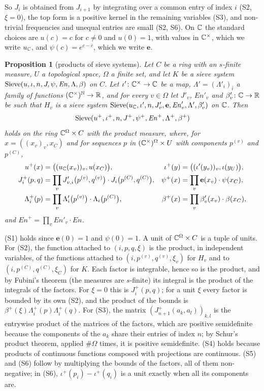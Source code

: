 \documentclass[11pt,a4paper]{article}
\makeatletter
\theoremstyle{plainx}
\newtheorem{proposition}[theorem]{Proposition}
\theoremstyle{uprightx}
\renewenvironment{proof}[1][Proof]{\par\pushQED{\qed}\normalfont\topsep0pt\partopsep0pt
  \trivlist\item[\hskip\labelsep\itshape #1.]\ignorespaces}{\popQED\endtrivlist\@endpefalse}
\newcommand{\cj}[1]{\overline{#1}}                  %
\makeatother
\begin{document}
So $J_i$ is obtained from $J_{i+1}$ by integrating over a common entry of index $i$ (S2, $\xi=0$), the top form is a
positive kernel in the remaining variables (S3), and non-trivial frequencies and unequal entries are small (S2, S6).
On $\mathbb{C}$ the standard choices are $u(c)=c$ for $c\ne0$ and $u(0)=1$, with values in $\mathbb{C}^\times$, which we write
$u_{\mathbb{C}}$, and $\psi(c)=e^{c-\cj{c}}$, which we write $\mathbf e$.

\begin{proposition}[products of sieve systems]\label{p:pi}
Let $C$ be a ring with an $s$-finite measure, $U$ a topological space, $\Omega$ a finite set, and let
$K$ be a sieve system $\operatorname{Sieve}(u,\iota,n,J,\psi,\mathit{En},\Lambda,\beta)$ on $C$. Let
$\iota'\colon\mathbb{C}^\times\to\mathbb{C}$ be a map, $\Lambda'=(\Lambda'_i)_i$ a family of functions
$(\mathbb{C}^{\times})^{\mathbb{N}}\to\mathbb{R}$, and for every $v\in\Omega$ let $J'_v$, $\mathit{En}'_v$ and
$\beta'_v\colon\mathbb{C}\to\mathbb{R}$ be such that $H_v$ is a sieve system
$\operatorname{Sieve}(u_{\mathbb{C}},\iota',n,J'_v,\mathbf e,\mathit{En}'_v,\Lambda',\beta'_v)$ on $\mathbb{C}$. Then
\[\operatorname{Sieve}(u^{+},\iota^{+},n,J^{+},\psi^{+},\mathit{En}^{+},\Lambda^{+},\beta^{+})\]
holds on the ring $\mathbb{C}^{\Omega}\times C$ with the product measure, where, for $x=((x_v)_v,x_C)$ and for sequences
$p$ in $(\mathbb{C}^\times)^\Omega\times U$ with components $p^{(v)}$ and $p^{(C)}$,
\begin{align*}
u^{+}(x)&=\bigl((u_{\mathbb{C}}(x_v))_v,u(x_C)\bigr), & \iota^{+}(y)&=\bigl((\iota'(y_v))_v,\iota(y_U)\bigr),\\
J^{+}_i(p,q)&=\prod_vJ'_{v,i}\bigl(p^{(v)},q^{(v)}\bigr)\cdot J_i\bigl(p^{(C)},q^{(C)}\bigr), & \psi^{+}(x)&=\prod_v\mathbf e(x_v)\cdot\psi(x_C),\\
\Lambda^{+}_i(p)&=\prod_v\Lambda'_i\bigl(p^{(v)}\bigr)\cdot\Lambda_i\bigl(p^{(C)}\bigr), & \beta^{+}(x)&=\prod_v\beta'_v(x_v)\cdot\beta(x_C),
\end{align*}
and $\mathit{En}^{+}=\prod_v\mathit{En}'_v\cdot\mathit{En}$.
\end{proposition}
\begin{proof}
(S1) holds since $\mathbf e(0)=1$ and $\psi(0)=1$. A unit of $\mathbb{C}^\Omega\times C$ is a tuple of units. For (S2), the
function attached to $(i,p,q,\xi)$ is the product, in independent variables, of the functions attached to
$(i,p^{(v)},q^{(v)},\xi_v)$ for $H_v$ and to $(i,p^{(C)},q^{(C)},\xi_C)$ for $K$. Each factor is integrable, hence so
is the product, and by Fubini's theorem (the measures are $s$-finite) its integral is the product of the integrals
of the factors. For $\xi=0$ this is $J^{+}_i(p,q)$; for a unit $\xi$ every factor is bounded by its own (S2), and
the product of the bounds is $\beta^{+}(\xi)\Lambda^{+}_i(p)\Lambda^{+}_i(q)$. For (S3), the matrix
$(J^{+}_{n+1}(a_k,a_l))_{k,l}$ is the entrywise product of the matrices of the factors, which are positive
semidefinite because the components of the $a_k$ share their entries of index $n$; by Schur's product theorem,
applied $\#\Omega$ times, it is positive semidefinite. (S4) holds because products of continuous functions composed
with projections are continuous. (S5) and (S6) follow by multiplying the bounds of the factors, all of them
non-negative; in (S6), $\iota^{+}(p_i)-\iota^{+}(q_i)$ is a unit exactly when all its components are.
\end{proof}
\end{document}
